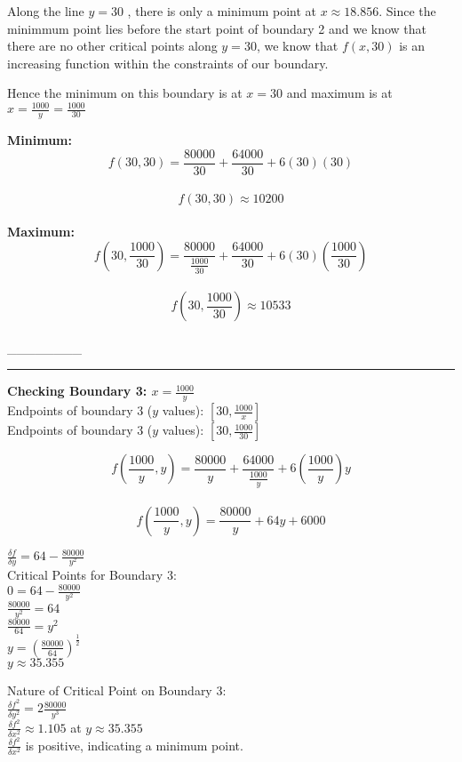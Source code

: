 \documentclass[11pt]{article}
\begin{document}
Along the line \(y = 30\) , there is only a minimum point at
\(x \approx 18.856\). Since the minimmum point lies before the start
point of boundary 2 and we know that there are no other critical points
along \(y = 30\), we know that \(f(x,30)\) is an increasing function
within the constraints of our boundary.

Hence the minimum on this boundary is at \(x=30\) and maximum is at
\(x=\frac {1000}{y} = \frac {1000}{30}\)

\textbf{Minimum:}\\
\[f(30,30) = \frac {80000}{30} + \frac {64000}{30} + 6(30)(30)\]\\
\[f(30,30) \approx 10200\]\\
\textbf{Maximum:}\\
\[f(30,\frac {1000}{30}) = \frac {80000}{\frac {1000}{30}} + \frac {64000}{30} + 6(30)(\frac {1000}{30})\]\\
\[f(30,\frac {1000}{30}) \approx 10533\]\\
\_\_\_\_\_\_\_\_

    \begin{center}\rule{0.5\linewidth}{\linethickness}\end{center}

\textbf{Checking Boundary 3: \(x = \frac{1000}{y}\)}\\
Endpoints of boundary 3 (\(y\) values): \([30,\frac{1000}{x}]\)\\
Endpoints of boundary 3 (\(y\) values): \([30,\frac{1000}{30}]\)

\[f(\frac{1000}{y},y) = \frac {80000}{y} + \frac {64000}{\frac{1000}{y}} + 6(\frac{1000}{y})y\]\\
\[f(\frac{1000}{y},y) = \frac {80000}{y} + 64y + 6000\]

\(\frac{\delta f}{\delta y} = 64-\frac{80000}{y^2}\)\\
Critical Points for Boundary 3:\\
\(0 = 64-\frac{80000}{y^2}\)\\
\(\frac{80000}{y^2} = 64\)\\
\(\frac{80000}{64} = y^2\)\\
\(y = (\frac{80000}{64})^\frac{1}{2}\)\\
\(y \approx 35.355\)

Nature of Critical Point on Boundary 3:\\
\(\frac{\delta f^2}{\delta y^2} = 2\frac {80000}{y^3}\)\\
\(\frac{\delta f^2}{\delta x^2} \approx 1.105\) at
\(y \approx 35.355\)\\
\(\frac{\delta f^2}{\delta x^2}\) is positive, indicating a minimum
point.
\end{document}
